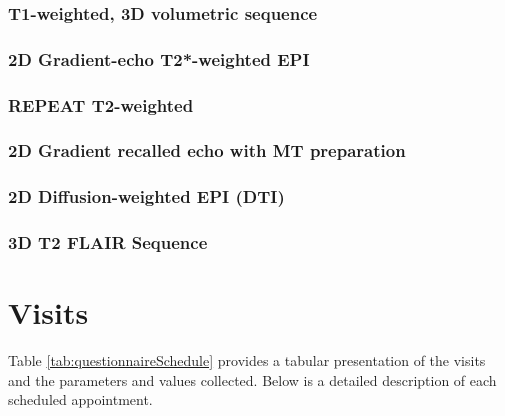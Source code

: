 \subsubsection{T1-weighted, 3D volumetric sequence}

\subsubsection{2D Gradient-echo T2*-weighted EPI}

\subsubsection{REPEAT T2-weighted}

\subsubsection{2D Gradient recalled echo with MT preparation}

\subsubsection{2D Diffusion-weighted EPI (\acf{DTI})}

\subsubsection{3D T2 \ac{FLAIR} Sequence}

\section{Visits}
Table \ref{tab:questionnaireSchedule} provides a tabular presentation of the visits and the parameters and values collected. Below is a detailed description of each scheduled appointment.



